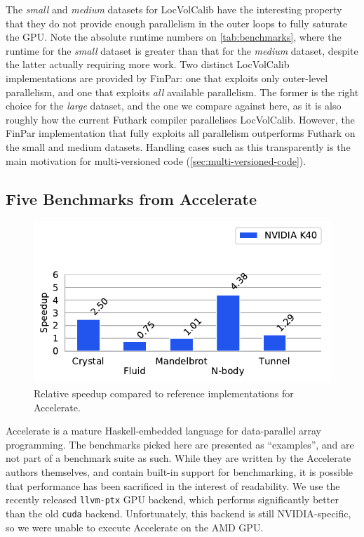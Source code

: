 The \textit{small} and \textit{medium} datasets for LocVolCalib have
the interesting property that they do not provide enough parallelism
in the outer loops to fully saturate the GPU.  Note the absolute
runtime numbers on \cref{tab:benchmarks}, where the runtime for the
\textit{small} dataset is greater than that for the \textit{medium}
dataset, despite the latter actually requiring more work.  Two
distinct LocVolCalib implementations are provided by FinPar: one that
exploits only outer-level parallelism, and one that exploits
\textit{all} available parallelism.  The former is the right choice for
the \textit{large} dataset, and the one we compare against here, as it
is also roughly how the current Futhark compiler parallelises
LocVolCalib.  However, the FinPar implementation that fully exploits
all parallelism outperforms Futhark on the small and medium datasets.
Handling cases such as this transparently is the main motivation for
multi-versioned code (\cref{sec:multi-versioned-code}).

\subsection{Five Benchmarks from Accelerate}
\label{sec:accelerate}

\begin{figure}
  \centering
  \includegraphics[scale=0.65]{experiments/accelerate.pdf}
  \caption{Relative speedup compared to reference implementations for
    Accelerate.}
  \label{fig:accelerate-speedup}
\end{figure}

Accelerate is a mature Haskell-embedded language for data-parallel
array programming.  The benchmarks picked here are presented as
``examples'', and are not part of a benchmark suite as such.  While
they are written by the Accelerate authors themselves, and contain
built-in support for benchmarking, it is possible that performance has
been sacrificed in the interest of readability.  We use the recently
released \texttt{llvm-ptx} GPU backend, which performs significantly
better than the old \texttt{cuda} backend.  Unfortunately, this
backend is still NVIDIA-specific, so we were unable to execute
Accelerate on the AMD GPU.

